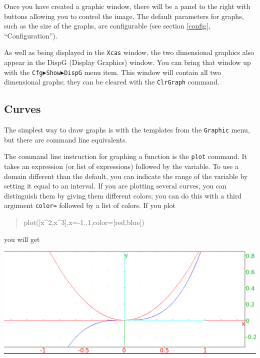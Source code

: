 \documentclass{article}
\newcommand{\xcasin}[1]
{\begin{quote}\ttfamily
#1
\end{quote}}
\begin{document}
Once you have created a graphic window, there will be a panel to the
right with buttons allowing you to control the image.  The default
parameters for graphs, such as the size of the graphs, are
configurable (see section \ref{config}, ``Configuration'').

As well as being displayed in the \texttt{Xcas} window, the two
dimensional graphics also appear in the DispG (Display Graphics)
window.  You can bring that window up with the
\texttt{Cfg$\blacktriangleright$Show$\blacktriangleright$DispG} menu item.
This window will contain all two dimensional graphs; they can be
cleared with the \texttt{ClrGraph} command. 

\subsection{Curves}

The simplest way to draw graphs is with the templates from the
\texttt{Graphic} menu, but there are command line equivalents. 

The command line instruction for graphing a function is the
\texttt{plot} command.  It takes an expression (or list of
expressions) followed by the variable.  To use a domain different than
the default, you can indicate the range of the variable by setting it
equal to an interval.  If you are plotting several curves, you can
distinguish them by giving them different colors; you can do this with
a third argument \texttt{color=} followed by a list of colors.
If you plot
\xcasin{plot([x\^{}2,x\^{}3],x=-1..1,color=[red,blue])}
you will get
\begin{center}
\includegraphics[width=\textwidth]{xcas-plot.png}
\end{center}
\end{document}
